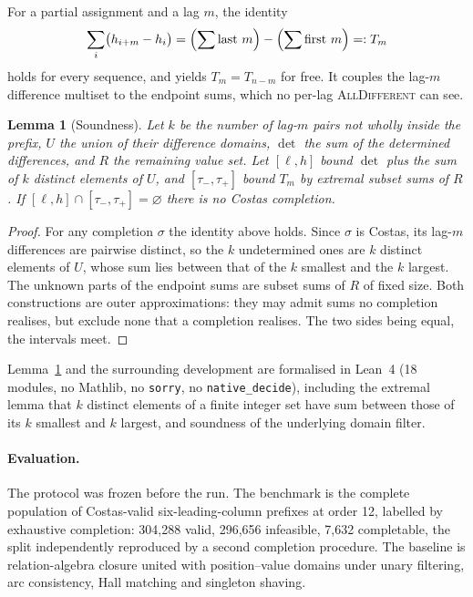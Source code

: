\documentclass[11pt,a4paper]{article}
\newtheorem{lemma}[theorem]{Lemma}
\theoremstyle{definition}
\theoremstyle{remark}
\begin{document}
For a partial assignment and a lag $m$, the identity
\[
\sum_{i}\bigl(h_{i+m}-h_i\bigr)=\Bigl(\sum\text{last }m\Bigr)-\Bigl(\sum\text{first }m\Bigr)=:T_m
\]
holds for every sequence, and yields $T_m=T_{n-m}$ for free. It couples the
lag-$m$ difference multiset to the endpoint sums, which no per-lag
\textsc{AllDifferent} can see.

\begin{lemma}[Soundness]\label{lem:sound}
Let $k$ be the number of lag-$m$ pairs not wholly inside the prefix, $U$ the union
of their difference domains, $\det$ the sum of the determined differences, and
$R$ the remaining value set. Let $[\ell,h]$ bound $\det$ plus the sum of $k$
distinct elements of $U$, and $[\tau_-,\tau_+]$ bound $T_m$ by extremal subset
sums of $R$. If $[\ell,h]\cap[\tau_-,\tau_+]=\varnothing$ there is no Costas
completion.
\end{lemma}
\begin{proof}
For any completion $\sigma$ the identity above holds. Since $\sigma$ is Costas,
its lag-$m$ differences are pairwise distinct, so the $k$ undetermined ones are
$k$ distinct elements of $U$, whose sum lies between that of the $k$ smallest and
the $k$ largest. The unknown parts of the endpoint sums are subset sums of $R$ of
fixed size. Both constructions are outer approximations: they may admit sums no
completion realises, but exclude none that a completion realises. The two sides
being equal, the intervals meet.
\end{proof}

Lemma~\ref{lem:sound} and the surrounding development are formalised in Lean~4
(18 modules, no Mathlib, no \texttt{sorry}, no \texttt{native\_decide}),
including the extremal lemma that $k$ distinct elements of a finite integer set
have sum between those of its $k$ smallest and $k$ largest, and soundness of the
underlying domain filter.

\paragraph{Evaluation.} The protocol was frozen before the run. The benchmark is
the complete population of Costas-valid six-leading-column prefixes at order 12,
labelled by exhaustive completion: 304{,}288 valid, 296{,}656 infeasible,
7{,}632 completable, the split independently reproduced by a second completion
procedure. The baseline is relation-algebra closure united with position--value
domains under unary filtering, arc consistency, Hall matching and singleton
shaving.
\end{document}
